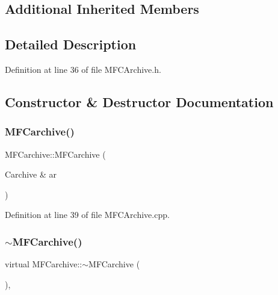 \subsection*{Additional Inherited Members}


\subsection{Detailed Description}


Definition at line 36 of file M\+F\+C\+Archive.\+h.



\subsection{Constructor \& Destructor Documentation}
\mbox{\label{class_m_f_carchive_adf62fabd21e51cf0f9e1a50fc0367201}} 
\subsubsection{\texorpdfstring{M\+F\+Carchive()}{MFCarchive()}}
{\footnotesize\ttfamily M\+F\+Carchive\+::\+M\+F\+Carchive (\begin{DoxyParamCaption}\item[{Carchive \&}]{ar }\end{DoxyParamCaption})}



Definition at line 39 of file M\+F\+C\+Archive.\+cpp.

\mbox{\label{class_m_f_carchive_aa328aff9303e279909cc3855019fdd73}} 
\subsubsection{\texorpdfstring{$\sim$\+M\+F\+Carchive()}{~MFCarchive()}}
{\footnotesize\ttfamily virtual M\+F\+Carchive\+::$\sim$\+M\+F\+Carchive (\begin{DoxyParamCaption}{ }\end{DoxyParamCaption})\hspace{0.3cm}{\ttfamily [inline]}, {\ttfamily [virtual]}}



